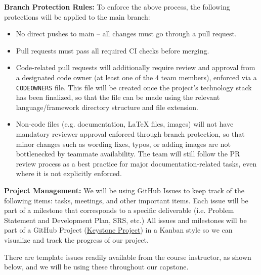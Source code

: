 \documentclass{article}
\begin{document}
\begin{itemize}
          \textbf{Branch Protection Rules:}
          To enforce the above process, the following protections will be applied to the main branch:
          \begin{itemize}
              \item No direct pushes to main -- all changes must go through a
                    pull request.
              \item Pull requests must pass all required CI checks before
                    merging.
              \item Code-related pull requests will additionally require review
                    and approval from a designated code owner (at least one of
                    the 4 team members), enforced via a \texttt{CODEOWNERS}
                    file. This file will be created once the project's
                    technology stack has been finalized, so that the file can
                    be made using the relevant language/framework directory
                    structure and file extension.
              \item Non-code files (e.g. documentation, LaTeX files, images)
                    will not have mandatory reviewer approval enforced through
                    branch protection, so that minor changes such as wording
                    fixes, typos, or adding images are not bottlenecked by
                    teammate availability. The team will still follow the PR
                    review process as a best practice for major
                    documentation-related tasks, even where it is not
                    explicitly enforced.
          \end{itemize}

          \textbf{Project Management:}
          We will be using GitHub Issues to keep track of the following items: tasks, meetings, and other important items.
          Each issue will be part of a milestone that corresponds to a specific deliverable (i.e. Problem Statement and Development Plan, SRS, etc.)
          All issues and milestones will be part of a GitHub Project (\href{https://github.com/users/Ayushpatel2026/projects/3}{Keystone Project}) in a Kanban style so we can visualize and track the progress of our project.

          There are template issues readily available from the course
          instructor, as shown below, and we will be using these throughout our
          capstone. \\


\end{itemize}
\end{document}
